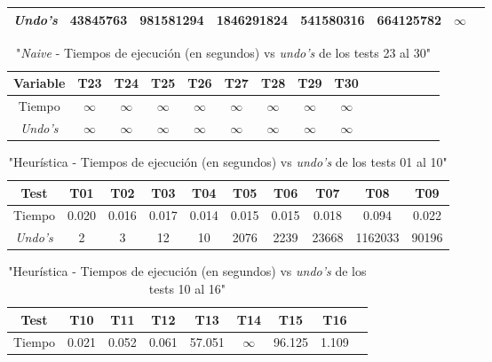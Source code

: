 \documentclass[12pt]{article}
\begin{document}
\begin{center}
\begin{table}[h]
\begin{tabular} {| c | c | c | c | c | c | c | c |}
            \textit{Undo's} & 43845763 & 981581294 & 1846291824 & 541580316 & 664125782 & $\infty$ \\
            \hline
        \end{tabular}
    \end{table}
    \begin{table}[h]
        \caption{"\textit{Naive} - Tiempos de ejecución (en segundos) vs \textit{undo's} de los tests 23 al 30"}
        \centering
        \begin{tabular} {| c | c | c | c | c | c | c | c | c | c | c | c | c | c | c |}
            \hline
            Variable & T23 & T24 & T25 & T26 & T27 & T28 & T29 & T30 \\
            \hline
            Tiempo & $\infty$ & $\infty$ & $\infty$ & $\infty$ & $\infty$ & $\infty$ & $\infty$ & $\infty$ \\
            \textit{Undo's} & $\infty$ & $\infty$ & $\infty$ & $\infty$ & $\infty$ & $\infty$ & $\infty$ & $\infty$ \\
            \hline
        \end{tabular}
    \end{table}
    \begin{table}[h]
        \caption{"Heurística - Tiempos de ejecución (en segundos) vs \textit{undo's} de los tests 01 al 10"}
        \centering
        \begin{tabular} {| c | c | c | c | c | c | c | c | c | c |}
            \hline
            Test & T01 & T02 & T03 & T04 & T05 & T06 & T07 & T08 & T09 \\
            \hline
            Tiempo & 0.020 & 0.016 & 0.017 & 0.014 & 0.015 & 0.015 & 0.018 & 0.094 & 0.022 \\
            \textit{Undo's} & 2 & 3 & 12 & 10 & 2076 & 2239 & 23668 & 1162033 & 90196 \\
            \hline
        \end{tabular}
    \end{table}
    \begin{table}[h]
        \caption{"Heurística - Tiempos de ejecución (en segundos) vs \textit{undo's} de los tests 10 al 16"}
        \centering
        \begin{tabular} {| c | c | c | c | c | c | c | c | c |}
            \hline
            Test & T10 & T11 & T12 & T13 & T14 & T15 & T16 \\
            \hline
            Tiempo & 0.021 & 0.052 & 0.061 & 57.051 & $\infty$ & 96.125 & 1.109 \\

\end{tabular}
\end{table}
\end{center}
\end{document}
